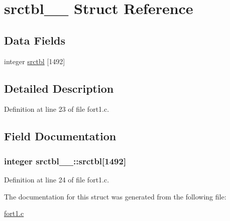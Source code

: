 \hypertarget{structsrctbl__1__}{}\section{srctbl\+\_\+\_\+ Struct Reference}
\label{structsrctbl__1__}
\subsection*{Data Fields}
\begin{DoxyCompactItemize}
\item 
integer \hyperlink{structsrctbl__1___af73596f288edda3cbdf7718d4ea69200}{srctbl} \mbox{[}1492\mbox{]}
\end{DoxyCompactItemize}


\subsection{Detailed Description}


Definition at line 23 of file fort1.\+c.



\subsection{Field Documentation}
\subsubsection[{\texorpdfstring{srctbl}{srctbl}}]{\setlength{\rightskip}{0pt plus 5cm}integer srctbl\+\_\+\_\+\+::srctbl\mbox{[}1492\mbox{]}}\hypertarget{structsrctbl__1___af73596f288edda3cbdf7718d4ea69200}{}\label{structsrctbl__1___af73596f288edda3cbdf7718d4ea69200}


Definition at line 24 of file fort1.\+c.



The documentation for this struct was generated from the following file\+:\begin{DoxyCompactItemize}
\item 
\hyperlink{fort1_8c}{fort1.\+c}\end{DoxyCompactItemize}
